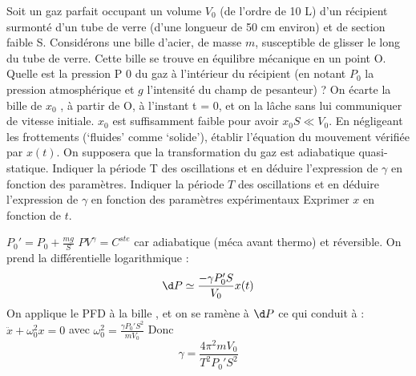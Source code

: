 \begin{Exercise}[title=Méthode de Rückhardt]
	Soit un gaz parfait occupant un volume $V_0$ (de l’ordre de 10 L) d’un récipient surmonté d’un tube de verre (d’une longueur de 50 cm environ) et de section faible S.
	Considérons une bille d’acier, de masse $m$, susceptible de glisser le long du tube de verre.
	Cette bille se trouve en équilibre mécanique en un point O.
	\Question Quelle est la pression P 0 du gaz à l’intérieur du récipient (en notant $P_0$ la pression atmosphérique et $g$ l’intensité du champ de pesanteur) ?
	\Question On écarte la bille de $x_0$ , à partir de O, à l’instant t = 0, et on la lâche sans lui communiquer de vitesse initiale. $x_0$ est suffisamment faible pour avoir $x_0S \ll V_0$.
	\subQuestion En négligeant les frottements (‘fluides’ comme ‘solide’), établir l’équation du mouvement
	vérifiée par $x(t)$. On supposera que la transformation du gaz est adiabatique quasi-statique. Indiquer la période T des oscillations et en déduire l’expression de $\gamma$ en fonction des paramètres.
	\subQuestion Indiquer la période $T$ des oscillations et en déduire l’expression de $\gamma$ en fonction des paramètres expérimentaux
	\subQuestion Exprimer $x$ en fonction de $t$.
\end{Exercise}
\begin{Answer}
	\Question $P_0'  = P_0 + \frac{mg}{S}$
	\Question $PV^\gamma = C^{ste}$ car adiabatique (méca avant thermo) et réversible. On prend la différentielle logarithmique :
	\[\d P \simeq \frac{-\gamma P_0' S}{V_0}x(t)\]
	On applique le PFD à la bille , et on se ramène à $\d P$ ce qui conduit à : $\ddot{x} +\omega_0^2 x = 0$ avec $\omega_0^2 = \frac{\gamma P_0' S^2}{mV_0}$
	Donc \[\gamma = \frac{4\pi^2 mV_0}{T^2P_0'S^2}\]
\end{Answer}
